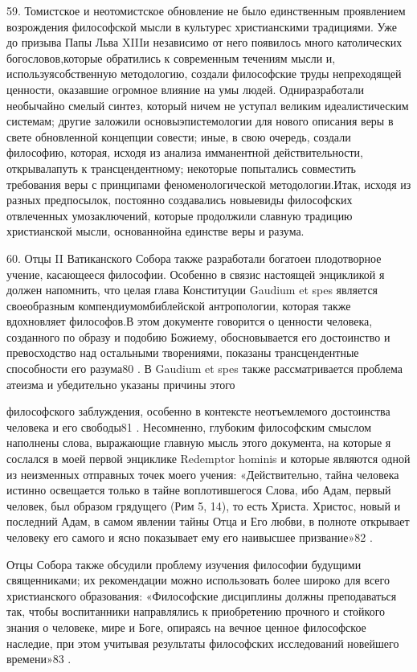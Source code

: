 \documentclass[a5paper,10pt]{article}
\begin{document}
59. Томистское и неотомистское обновление не было единственным проявлением
возрождения философской мысли в культурес христианскими традициями. Уже до
призыва Папы Льва XIIIи независимо от него появилось много католических
богословов,которые обратились к современным течениям мысли и,
используясобственную методологию, создали философские труды непреходящей
ценности, оказавшие огромное влияние на умы людей. Одниразработали необычайно
смелый синтез, который ничем не уступал великим идеалистическим системам;
другие заложили основыэпистемологии для нового описания веры в свете
обновленной концепции совести; иные, в свою очередь, создали философию,
которая, исходя из анализа имманентной действительности, открывалапуть к
трансцендентному; некоторые попытались совместить требования веры с принципами
феноменологической методологии.Итак, исходя из разных предпосылок, постоянно
создавались новыевиды философских отвлеченных умозаключений, которые продолжили
славную традицию христианской мысли, основаннойна единстве веры и разума.

60. Отцы II Ватиканского Собора также разработали богатоеи плодотворное учение,
касающееся философии. Особенно в связис настоящей энцикликой я должен
напомнить, что целая глава Конституции Gaudium et spes является своеобразным
компендиумомбиблейской антропологии, которая также вдохновляет философов.В этом
документе говорится о ценности человека, созданного по образу и подобию
Божиему, обосновывается его достоинство и превосходство над остальными
творениями, показаны трансцендентные способности его разума80 . В Gaudium et
spes также рассматривается проблема атеизма и убедительно указаны причины этого

философского заблуждения, особенно в контексте неотъемлемого достоинства
человека и его свободы81 . Несомненно, глубоким философским смыслом наполнены
слова, выражающие главную мысль этого документа, на которые я сослался в моей
первой энциклике Redemptor hominis и которые являются одной из неизменных
отправных точек моего учения: «Действительно, тайна человека истинно освещается
только в тайне воплотившегося Слова, ибо Адам, первый человек, был образом
грядущего (Рим 5, 14), то есть Христа. Христос, новый и последний Адам, в самом
явлении тайны Отца и Его любви, в полноте открывает человеку его самого и ясно
показывает ему его наивысшее призвание»82 .

Отцы Собора также обсудили проблему изучения философии будущими священниками;
их рекомендации можно использовать более широко для всего христианского
образования: «Философские дисциплины должны преподаваться так, чтобы
воспитанники направлялись к приобретению прочного и стойкого знания о человеке,
мире и Боге, опираясь на вечное ценное философское наследие, при этом учитывая
результаты философских исследований новейшего времени»83 .
\end{document}
